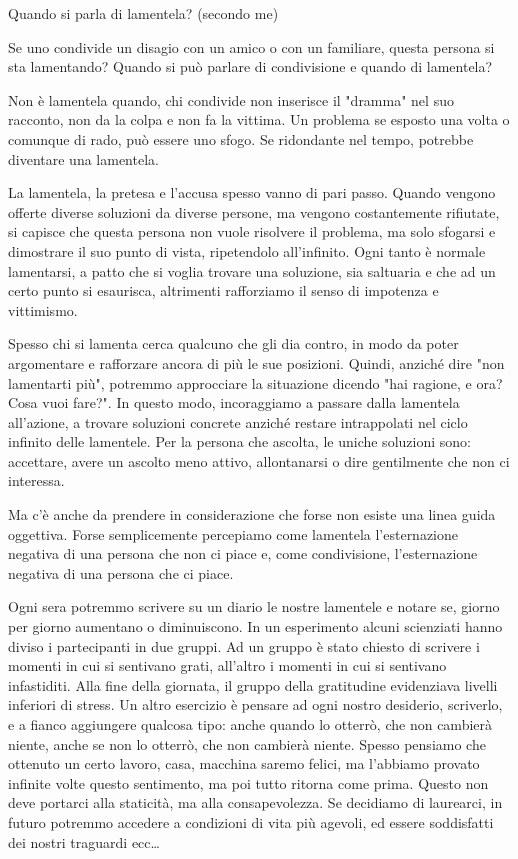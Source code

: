 \documentclass[12pt]{book} %
\begin{document}
\begin{mdframed}[linewidth=1pt]
Quando si parla di lamentela? (secondo me)

Se uno condivide un disagio con un amico o con un familiare, questa persona si sta lamentando? Quando si può parlare di
condivisione e quando di lamentela?

Non è lamentela quando, chi condivide non inserisce il "dramma" nel suo racconto, non da la colpa e non fa la vittima. 
Un problema se esposto una volta o comunque di rado, può essere uno sfogo. Se ridondante nel tempo, potrebbe diventare una lamentela.

La lamentela, la pretesa e l'accusa spesso vanno di pari passo. Quando vengono offerte diverse soluzioni da diverse
persone, ma vengono costantemente rifiutate, si capisce che questa persona non vuole risolvere il problema, ma solo
sfogarsi e dimostrare il suo punto di vista, ripetendolo all'infinito. Ogni tanto è normale lamentarsi, a patto che si voglia trovare una soluzione, sia saltuaria e che ad un certo punto si esaurisca, altrimenti rafforziamo il senso di impotenza e vittimismo.

Spesso chi si lamenta cerca qualcuno che gli dia contro, in modo da poter argomentare e rafforzare ancora di più le sue
posizioni. Quindi, anziché dire "non lamentarti più", potremmo approcciare la situazione
dicendo "hai ragione, e ora? Cosa vuoi fare?". In questo modo, incoraggiamo a passare dalla
lamentela all'azione, a trovare soluzioni concrete anziché restare intrappolati nel ciclo infinito delle lamentele. 
Per la persona che ascolta, le uniche soluzioni sono: accettare, avere un ascolto meno attivo, allontanarsi o dire gentilmente che non ci interessa.

Ma c'è anche da prendere in considerazione che forse non esiste una linea guida oggettiva. Forse
semplicemente percepiamo come lamentela l'esternazione negativa di una persona che non ci piace e, come condivisione,
l'esternazione negativa di una persona che ci piace.

Ogni sera potremmo scrivere su un diario le nostre lamentele e notare se, giorno per giorno
aumentano o diminuiscono. In un esperimento alcuni scienziati hanno diviso i partecipanti in due gruppi. Ad
un gruppo è stato chiesto di scrivere i momenti in cui si sentivano grati, all'altro i momenti in
cui si sentivano infastiditi. Alla fine della giornata, il gruppo della gratitudine evidenziava livelli inferiori di stress.
Un altro esercizio è pensare ad ogni nostro desiderio, scriverlo, e a fianco aggiungere qualcosa tipo: anche quando lo otterrò, che non cambierà niente, anche se non lo otterrò, che non cambierà niente.
Spesso pensiamo che ottenuto un certo lavoro, casa, macchina saremo felici, ma l'abbiamo provato infinite volte questo sentimento, ma poi tutto ritorna come prima. Questo non deve portarci alla staticità, ma alla consapevolezza. Se decidiamo di laurearci, in futuro potremmo accedere a condizioni di vita più agevoli, ed essere soddisfatti dei nostri traguardi ecc…


\end{mdframed}
\end{document}
